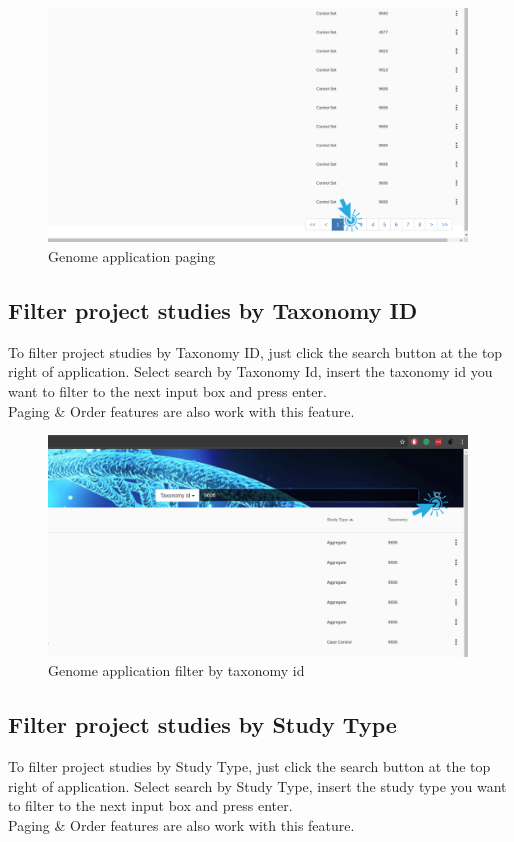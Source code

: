 \documentclass[a4paper,12pt]{article}
\begin{document}
\begin{figure}[H]
\centering
\includegraphics[width=0.99\textwidth]{images/genome-paging}
\caption{Genome application paging}
\end{figure}

\subsection{Filter project studies by Taxonomy ID}
To filter project studies by Taxonomy ID, just click the search button at the top right of application. Select search by Taxonomy Id, insert the taxonomy id you want to filter to the next input box and press enter.\\
Paging \& Order features are also work with this feature.

\begin{figure}[H]
\centering
\includegraphics[width=0.99\textwidth]{images/genome-filter-taxonomy}
\caption{Genome application filter by taxonomy id}
\end{figure}

\subsection{Filter project studies by Study Type}
To filter project studies by Study Type, just click the search button at the top right of application. Select search by Study Type, insert the study type you want to filter to the next input box and press enter.\\
Paging \& Order features are also work with this feature.
\end{document}
